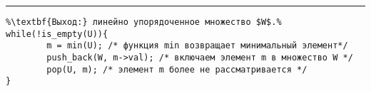 \vspace{5pt} \hrule
\begin{lstlisting}[caption={Алгоритм топологической сортировки}, label=p_69, escapechar=\%]
%\noindent\textbf{Вход:} конечное частично упорядоченное множество $U$.\\%
%\textbf{Выход:} линейно упорядоченное множество $W$.%
while(!is_empty(U)){
        m = min(U); /* функция min возвращает минимальный элемент*/
        push_back(W, m->val); /* включаем элемент m в множество W */
        pop(U, m); /* элемент m более не рассматривается */
}
\end{lstlisting}
